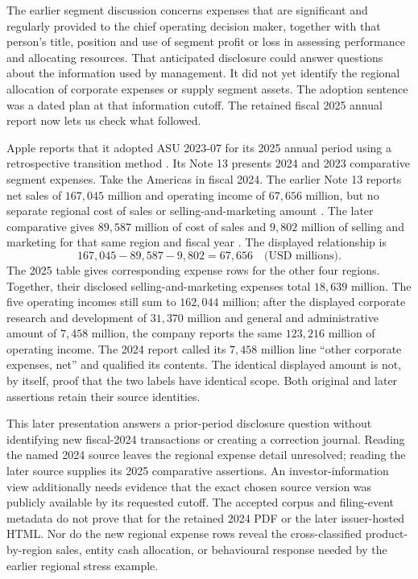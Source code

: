 The earlier segment discussion concerns expenses that are significant and regularly
provided to the chief operating decision maker, together with that person's
title, position and use of segment profit or loss in assessing performance and
allocating resources. That anticipated disclosure could answer questions about
the information used by management. It did not yet identify the regional
allocation of corporate expenses or supply segment assets. The adoption
sentence was a dated plan at that information cutoff. The retained fiscal
2025 annual report now lets us check what followed.

Apple reports that it adopted ASU 2023-07 for its 2025 annual period using a
retrospective transition method \citep[Note 1]{apple2025annual}. Its Note 13
presents 2024 and 2023 comparative segment expenses. Take the Americas in
fiscal 2024. The earlier Note 13 reports net sales of $167{,}045$ million
and operating income of $67{,}656$ million, but no separate regional cost of
sales or selling-and-marketing amount \citep[Note 13, printed p.~47]{apple2024}.
The later comparative gives $89{,}587$ million of cost of sales and $9{,}802$
million of selling and marketing for that same region and fiscal year
\citep[Note 13, printed p.~47]{apple2025annual}. The displayed relationship is
\[
167{,}045-89{,}587-9{,}802=67{,}656\quad\text{(USD millions).}
\]
The 2025 table gives corresponding expense rows for the other four regions.
Together, their disclosed selling-and-marketing expenses total $18{,}639$
million. The five operating incomes still sum to $162{,}044$ million; after
the displayed corporate research and development of $31{,}370$ million and
general and administrative amount of $7{,}458$ million, the company reports
the same $123{,}216$ million of operating income. The 2024 report called its
$7{,}458$ million line ``other corporate expenses, net'' and qualified its
contents. The identical displayed amount is not, by itself, proof that the
two labels have identical scope. Both original and later assertions retain
their source identities.

This later presentation answers a prior-period disclosure question without
identifying new fiscal-2024 transactions or creating a correction journal.
Reading the named 2024 source leaves the regional expense detail unresolved;
reading the later source supplies its 2025 comparative assertions. An
investor-information view additionally needs evidence that the exact chosen
source version was publicly available by its requested cutoff. The accepted
corpus and filing-event metadata do not prove that for the retained 2024 PDF
or the later issuer-hosted HTML. Nor do the new regional expense rows reveal
the cross-classified product-by-region sales, entity cash allocation, or
behavioural response needed by the earlier regional stress example.


